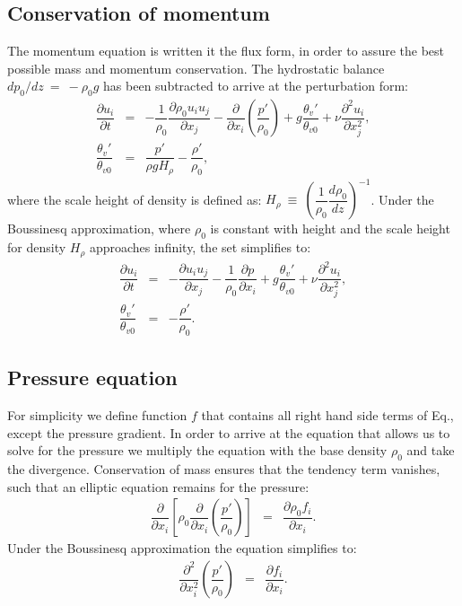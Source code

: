 \documentclass[gmd]{copernicus}
\begin{document}
\subsection{Conservation of momentum}
The momentum equation is written it the flux form, in order to assure the best possible mass and momentum conservation. The hydrostatic balance $dp_0 / dz~=~-\rho_0 g$ has been subtracted to arrive at the perturbation form:
\begin{eqnarray}
\dfrac{\partial u_i}{\partial t} & = & - \dfrac{1}{\rho_0} \dfrac{\partial \rho_0 u_i u_j}{\partial x_j} 
- \dfrac{\partial}{\partial x_i}\left(\dfrac{p'}{\rho_0}\right) + g \dfrac{\theta_v'}{\theta_{v0}} + \nu \dfrac{\partial^2 u_i}{\partial x_j^2}\label{eq:consmoma},\\
\dfrac{\theta_v'}{\theta_{v0}} & = & \dfrac{p'}{\rho g H_{\rho}} - \dfrac{\rho'}{\rho_0}\label{eq:statea},
\end{eqnarray}
where the scale height of density is defined as: $H_{\rho}~\equiv~\left( \dfrac{1}{\rho_0} \dfrac{d\rho_0}{dz} \right)^{-1}$. Under the Boussinesq approximation, where $\rho_0$ is constant with height and the scale height for density $H_\rho$ approaches infinity, the set simplifies to:
\begin{eqnarray}
\dfrac{\partial u_i}{\partial t} & = & - \dfrac{\partial u_i u_j}{\partial x_j}
- \dfrac{1}{\rho_0}\dfrac{\partial p}{\partial x_i} + g \dfrac{\theta_v'}{\theta_{v0}} + \nu \dfrac{\partial^2 u_i}{\partial x_j^2}\label{eq:consmomb},\\
\dfrac{\theta_v'}{\theta_{v0}} & = & - \dfrac{\rho'}{\rho_0}\label{eq:stateb}.
\end{eqnarray}

\subsection{Pressure equation}
For simplicity we define function $f$ that contains all right hand side terms of Eq., except the pressure gradient. In order to arrive at the equation that allows us to solve for the pressure we multiply the equation with the base density $\rho_0$ and take the divergence. Conservation of mass ensures that the tendency term vanishes, such that an elliptic equation remains for the pressure:
\begin{eqnarray}
\dfrac{\partial}{\partial x_i} 
\left[ \rho_0 \dfrac{\partial}{\partial x_i} \left( \dfrac{p'}{\rho_0} \right) \right] & = &
\dfrac{\partial \rho_0 f_i}{\partial x_i}.
\end{eqnarray}
Under the Boussinesq approximation the equation simplifies to:
\begin{eqnarray}
\dfrac{\partial^2}{\partial x_i^2} \left( \dfrac{p'}{\rho_0} \right) & = &
\dfrac{\partial f_i}{\partial x_i}.
\end{eqnarray}
\end{document}
